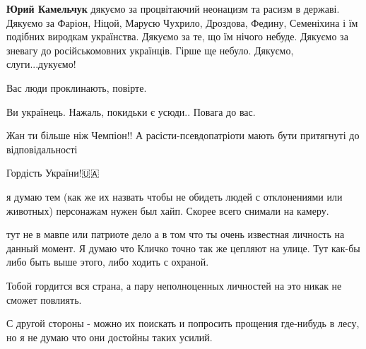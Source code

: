 \begin{itemize}
\begin{itemize}
\textbf{Юрий Камельчук} дякуємо за процвітаючий неонацизм та расизм в
державі. Дякуємо за Фаріон, Ніцой, Марусю Чухрило, Дроздова, Федину, Семеніхина і їм
подібних виродкам українства. Дякуємо за те, що їм нічого небуде. Дякуємо за
зневагу до російськомовних українців.  Гірше ще небуло. Дякуємо, слуги...дукуємо!

Вас люди проклинають, повірте.

\end{itemize}

 
Ви українець. Нажаль, покидьки є усюди.. Повага до вас.

 

Жан ти більше ніж Чемпіон!! А расісти-псевдопатріоти мають бути притягнуті до відповідальності

 
Гордість України!🇺🇦

 

я думаю тем (как же их назвать чтобы не обидеть людей с отклонениями или
животных) персонажам нужен был хайп. Скорее всего снимали на камеру.

тут не в мавпе или патриоте дело а в том что ты очень известная личность на
данный момент. Я думаю что Кличко точно так же цепляют на улице. Тут как-бы
либо быть выше этого, либо ходить с охраной.

Тобой гордится вся страна, а пару неполноценных личностей на это никак не
сможет повлиять.

С другой стороны - можно их поискать и попросить прощения где-нибудь в лесу, но
я не думаю что они достойны таких усилий.


\end{itemize}
